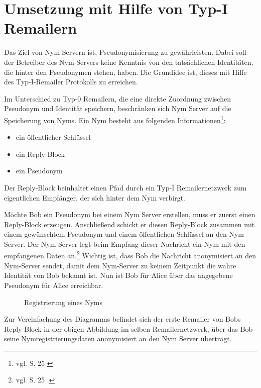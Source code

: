 \section{Umsetzung mit Hilfe von Typ-I Remailern}
Das Ziel von Nym-Servern ist, Pseudonymisierung zu gewährleisten. Dabei soll der Betreiber des Nym-Servers keine Kenntnis von den tatsächlichen Identitäten, die hinter den Pseudonymen stehen, haben. Die Grundidee ist, dieses mit Hilfe des Typ-I-Remailer Protokolls zu erreichen.

Im Unterschied zu Typ-0 Remailern, die eine direkte Zuordnung zwischen Pseudonym und Identität speichern, beschränken sich Nym Server auf die Speicherung von Nyms.
Ein Nym besteht aus folgenden Informationen\footnote{vgl. S. 25 \cite{loesing2009privacy}}:
\begin{itemize}
\item ein öffentlicher Schlüssel
\item ein Reply-Block
\item ein Pseudonym
\end{itemize}

Der Reply-Block beinhaltet einen Pfad durch ein Typ-I Remailernetzwerk zum eigentlichen Empfänger, der sich hinter dem Nym verbirgt.

Möchte Bob ein Pseudonym bei einem Nym Server erstellen, muss er zuerst einen Reply-Block erzeugen. Anschließend schickt er diesen Reply-Block zusammen mit einem gewünschtem Pseudonym und einem öffentlichen Schlüssel an den Nym Server. Der Nym Server legt beim Empfang dieser Nachricht ein Nym mit den empfangenen Daten an.\footnote{vgl. S. 25 \cite{loesing2009privacy}.} Wichtig ist, dass Bob die Nachricht anonymisiert an den Nym-Server sendet, damit dem Nym-Server zu keinem Zeitpunkt die wahre Identität von Bob bekannt ist. Nun ist Bob für Alice über das angegebene Pseudonym für Alice erreichbar.

\begin{figure}
	\centering
	\begin{sequencediagram}
	\end{sequencediagram}
	\caption{Registrierung eines Nyms}
\end{figure}

Zur Vereinfachung des Diagramms befindet sich der erste Remailer von Bobs Reply-Block in der obigen Abbildung im selben Remailernetzwerk, über das Bob seine Nymregistrierungsdaten anonymisiert an den Nym Server überträgt.

